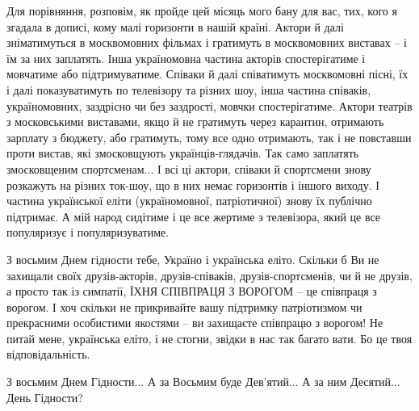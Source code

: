 Для порівняння, розповім, як пройде цей місяць мого бану для вас, тих, кого я
згадала в дописі, кому малі горизонти в нашій країні. Актори й далі
зніматимуться в москвомовних фільмах і гратимуть в москвомовних виставах – і їм
за них заплатять. Інша україномовна частина акторів спостерігатиме і мовчатиме
або підтримуватиме. Співаки й далі співатимуть москвомовні пісні, їх і далі
показуватимуть по телевізору та різних шоу, інша частина співаків,
україномовних, заздрісно чи без заздрості, мовчки спостерігатиме. Актори
театрів з московськими виставами, якщо й не гратимуть через карантин, отримають
зарплату з бюджету, або гратимуть, тому все одно отримають, так і не повставши
проти вистав, які змосковщують українців-глядачів. Так само заплатять
змосковщеним спортсменам... І всі ці актори, співаки й спортсмени знову розкажуть
на різних ток-шоу, що в них немає горизонтів і іншого виходу. І частина
української еліти (україномовної, патріотичної) знову їх публічно підтримає. А
мій народ сидітиме і це все жертиме з телевізора, який це все популяризує і
популяризуватиме. 

З восьмим Днем гідности тебе, Україно і українська еліто. Скільки б Ви не
захищали своїх друзів-акторів, друзів-співаків, друзів-спортсменів, чи й не
друзів, а просто так із симпатії, ЇХНЯ СПІВПРАЦЯ З ВОРОГОМ – це співпраця з
ворогом. І хоч скільки не прикривайте вашу підтримку патріотизмом чи
прекрасними особистими якостями – ви захищаєте співпрацю з ворогом!  Не питай
мене, українська еліто, і не стогни, звідки в нас так багато вати. Бо це твоя
відповідальність. 

З восьмим Днем Гідности... А за Восьмим буде Дев’ятий... А за ним Десятий... День
Гідности?

